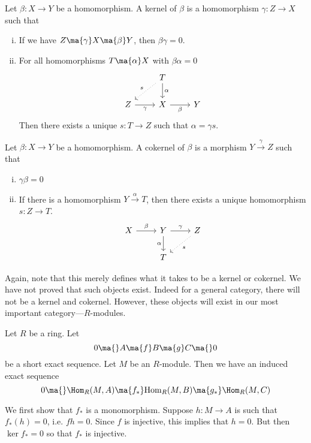 \begin{dfn}
Let $\beta: X \rightarrow Y$ be a homomorphism. A kernel of $\beta$ is a homomorphism $\gamma: Z \rightarrow X$ such that
	\begin{enumerate}[(i)]
	\item If we have $Z \ma{\gamma} X \ma{\beta} Y$, then $\beta \gamma=0$.
	\item For all homomorphisms $T \ma{\alpha} X$ with $\beta \alpha=0$
		\[
		\begin{tikzcd}
		\; & T \arrow[swap,dotted]{dl}{s} \arrow{d}{\alpha} & \; \\
		 Z  \arrow[swap]{r}{\gamma} &  X \arrow[swap]{r}{\beta} & Y
		\end{tikzcd}
		\]
Then there exists a unique $s: T \to Z$ such that $\alpha=\gamma s$.
	\end{enumerate}

Let $\beta: X \rightarrow Y$ be a homomorphism. A cokernel of $\beta$ is a morphism $Y \stackrel{\gamma}{\longrightarrow} Z$ such that
	\begin{enumerate}[(i)]
	\item $\gamma \beta=0$
	\item If there is a homomorphism $Y \stackrel{\alpha}{\longrightarrow} T$, then there exists a unique homomorphism $s: Z \rightarrow T$.
		\[
		\begin{tikzcd}
		X \arrow{r}{\beta} & Y \arrow{r}{\gamma} \arrow[swap]{d}{\alpha} & Z \arrow[dotted]{dl}{s} \\
		& T & 
		\end{tikzcd}
		\]
\end{enumerate}
\end{dfn}


Again, note that this merely defines what it takes to be a kernel or cokernel. We have not proved that such objects exist. Indeed for a general category, there will not be a kernel and cokernel. However, these objects will exist in our most important category---$R$-modules. 


\begin{prop} \label{prop:homexact}
Let $R$ be a ring. Let 
	\[
	0 \ma{} A \ma{f} B \ma{g} C \ma{} 0
	\]
be a short exact sequence. Let $M$ be an $R$-module. Then we have an induced exact sequence
	\[
	0 \ma{} \Hom_R(M,A) \ma{f_*} \text{Hom}_R(M,B) \ma{g_*} \Hom_R(M,C) 
	\]
\end{prop}

\pf We first show that $f_*$ is a monomorphism. Suppose $h: M \to A$ is such that $f_*(h)=0$, i.e. $fh=0$. Since $f$ is injective, this implies that $h=0$. But then $\ker f_*=0$ so that $f_*$ is injective. 



